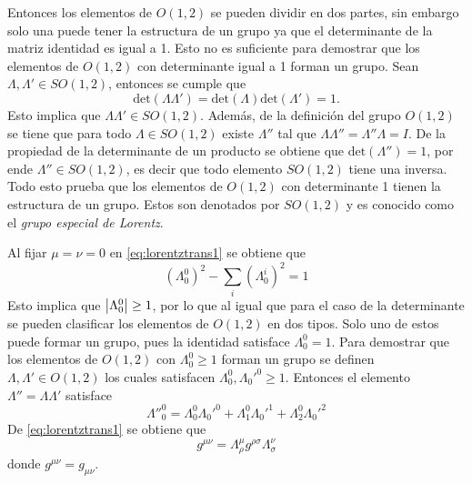 Entonces los elementos de $O(1,2)$ se pueden dividir en dos partes, sin embargo solo una puede tener la estructura de un grupo ya que el determinante de la matriz identidad es igual a 1. Esto no es suficiente para demostrar que los elementos de $O(1,2)$ con determinante igual a 1 forman un grupo. Sean $\Lambda, \Lambda' \in SO(1,2)$, entonces se cumple que
\begin{equation}
	\text{det}(\Lambda\Lambda') = \text{det}(\Lambda)\text{det}(\Lambda') =1.
\end{equation}
Esto implica que $\Lambda\Lambda' \in SO(1,2)$. Además, de la definición del grupo $O(1,2)$ se tiene que para todo $\Lambda \in SO(1,2)$ existe $\Lambda''$ tal que $\Lambda\Lambda'' = \Lambda''\Lambda=I$. De la propiedad de la determinante de un producto se obtiene que $\text{det}(\Lambda'') = 1$, por ende $\Lambda'' \in SO(1,2)$, es decir que todo elemento $SO(1,2)$ tiene una inversa. Todo esto prueba que los elementos de $O(1,2)$ con determinante 1 tienen la estructura de un grupo. Estos son denotados por $SO(1,2)$ y es conocido como el \emph{grupo especial de Lorentz}.

Al fijar $\mu= \nu = 0$ en \eqref{eq:lorentztrans1} se obtiene que
\begin{equation}
	(\Lambda_0^0)^2 - \sum_i(\Lambda_0^i)^2 = 1\label{eq:relaorth1}
\end{equation}
Esto implica que $\abs{\Lambda_0^0}\geq 1$, por lo que al igual que para el caso de la determinante se pueden clasificar los elementos de $O(1,2)$ en dos tipos. Solo uno de estos puede formar un grupo, pues la identidad satisface $\Lambda_0^0 =1$. Para demostrar que los elementos de $O(1,2)$ con $\Lambda_0^0\geq 1$ forman un grupo se definen $\Lambda, \Lambda' \in O(1,2)$ los cuales satisfacen $\Lambda_0^0,\Lambda_0'^0\geq 1$. Entonces el elemento $\Lambda'' = \Lambda \Lambda'$ satisface
\begin{equation}
	\Lambda''^0_0 = \Lambda_0^0 \Lambda_0'^0 + \Lambda_1^0 \Lambda_0'^1 + \Lambda_2^0 \Lambda_0'^2\label{eq:orthoProduct}
\end{equation}
De \eqref{eq:lorentztrans1} se obtiene que
\begin{equation}
	g^{\mu\nu} = \Lambda_\rho^{\mu} g^{\rho\sigma}\Lambda_\sigma^{\nu}
\end{equation}
donde $g^{\mu\nu} = g_{\mu\nu}$.

